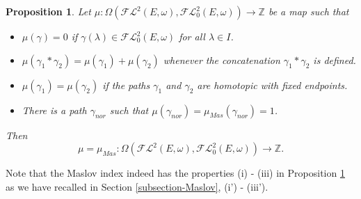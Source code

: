 \documentclass[a4paper,10pt]{article}
\newtheorem{prop}[theorem]{Proposition}
\begin{document}
\begin{prop}\label{uniqueness}
Let $\mu:\Omega(\mathcal{FL}^2(E,\omega),\mathcal{FL}^2_0(E,\omega))\rightarrow\mathbb{Z}$ be a map such that

\begin{itemize}
\item[(i)] $\mu(\gamma)=0$ if $\gamma(\lambda)\in\mathcal{FL}^2_0(E,\omega)$ for all $\lambda\in I$.
\item[(ii)] $\mu(\gamma_1\ast\gamma_2)=\mu(\gamma_1)+\mu(\gamma_2)$ whenever the concatenation $\gamma_1\ast\gamma_2$ is defined.
\item[(iii)] $\mu(\gamma_1)=\mu(\gamma_2)$ if the paths $\gamma_1$ and $\gamma_2$ are homotopic with fixed endpoints.
\item[(iv)] There is a path $\gamma_{nor}$ such that $\mu(\gamma_{nor})=\mu_{Mas}(\gamma_{nor})=1$.
\end{itemize}
Then \[
\mu=\mu_{Mas}:\Omega(\mathcal{FL}^2(E,\omega),\mathcal{FL}^2_0(E,\omega))\rightarrow\mathbb{Z}.\]
\end{prop}
\noindent
Note that the Maslov index indeed has the properties (i) - (iii) in Proposition \ref{uniqueness} as we have recalled in Section \ref{subsection-Maslov}, (i') - (iii').
\end{document}
